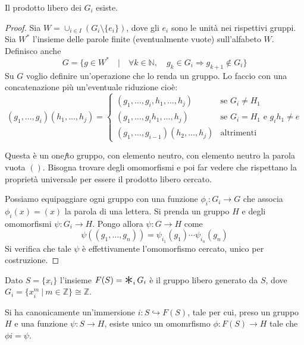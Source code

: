 \begin{prop}
    Il prodotto libero dei $G_i$ esiste.
\end{prop}
\begin{proof}
    Sia $W = \cup_{i\in I}(G_i\setminus \{e_i\})$, dove gli $e_i$ sono le unit\`a nei rispettivi gruppi. Sia $W^*$ l'insieme delle parole finite (eventualmente vuote) sull'alfabeto $W$. Definisco anche
        \[
        G = \{g \in W^* \quad | \quad \forall k \in \mathbb{N},\quad g_k\in G_i \Rightarrow g_{k+1} \notin G_i\}
        \]
        Su $G$ voglio definire un'operazione che lo renda un gruppo. Lo faccio con una concatenazione pi\`u un'eventuale riduzione cio\`e:
        \[
        (g_1, \dots, g_i)(h_1,\dots, h_j) =
        \begin{cases}
            (g_1, \dots, g_i, h_1, \dots, h_j) & \text{se $G_i \neq H_1$}\\
            (g_1, \dots, g_ih_1, \dots, h_j) & \text{se $G_i = H_1$ e $g_ih_1 \neq e$}\\
            (g_1, \dots, g_{i-1})(h_2, \dots, h_j) & \text{altrimenti}

        \end{cases}
        \]

        Questa \`e un one\textit{f}to gruppo, con elemento neutro, con elemento neutro la parola vuota $()$. Bisogna trovare degli omomorfismi e poi far vedere che rispettano la propriet\`a universale per essere il prodotto libero cercato.

        Possiamo equipaggiare ogni gruppo con una funzione $\phi_i\colon G_i\longrightarrow G$ che associa $\phi_i(x)=(x)$ la parola di una lettera. Si prenda un gruppo $H$ e degli omomorfismi $\psi\colon G_i\longrightarrow H$. Pongo allora $\psi\colon G\longrightarrow H$ come
        \[
            \psi((g_1, \dots, g_n)) = \psi_{i_1}(g_1)\cdots\psi_{i_n}(g_n)
        \]
        Si verifica che tale $\psi$ \`e effettivamente l'omomorfismo cercato, unico per costruzione.
\end{proof}

\begin{defn}
    Dato $S=\{x_i\}$ l'insieme $F(S)=\Conv_i G_i$ \`e il gruppo libero generato da $S$, dove $G_i=\{x_i^m \ |\ m\in\mathbb{Z}\}\cong \mathbb{Z}$.
\end{defn}

\begin{oss}
    Si ha canonicamente un'immersione $i\colon S\hookrightarrow F(S)$, tale per cui, preso un gruppo $H$ e una funzione $\psi\colon S \rightarrow H$, esiste unico un omomrfismo $\phi\colon F(S)\rightarrow H$ tale che $\phi i = \psi$.
\end{oss}

